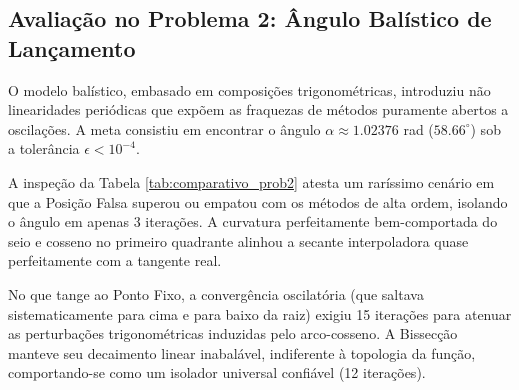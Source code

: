 \subsection{Avaliação no Problema 2: Ângulo Balístico de Lançamento}
\label{subsec:comparativo_missil}

O modelo balístico, embasado em composições trigonométricas, introduziu não linearidades periódicas que expõem as fraquezas de métodos puramente abertos a oscilações. A meta consistiu em encontrar o ângulo $\alpha \approx 1.02376$ rad ($58.66^\circ$) sob a tolerância $\epsilon < 10^{-4}$.

\begin{table}[htpb]
\centering
\caption{Quadro comparativo de desempenho para o Problema 2 (Ângulo $\alpha$).}
\label{tab:comparativo_prob2}
\small
{}
\end{table}

A inspeção da Tabela \ref{tab:comparativo_prob2} atesta um raríssimo cenário em que a Posição Falsa superou ou empatou com os métodos de alta ordem, isolando o ângulo em apenas 3 iterações. A curvatura perfeitamente bem-comportada do seio e cosseno no primeiro quadrante alinhou a secante interpoladora quase perfeitamente com a tangente real. 

No que tange ao Ponto Fixo, a convergência oscilatória (que saltava sistematicamente para cima e para baixo da raiz) exigiu 15 iterações para atenuar as perturbações trigonométricas induzidas pelo arco-cosseno. A Bissecção manteve seu decaimento linear inabalável, indiferente à topologia da função, comportando-se como um isolador universal confiável (12 iterações).

